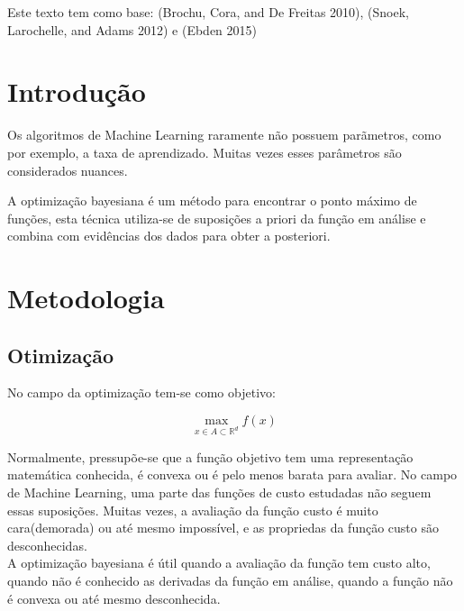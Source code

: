 \documentclass[
	12pt,				%
	openright,			%
	twoside,			%
	a4paper,			%
	english,			%
	french,				%
	spanish,			%
	brazil,				%
]{abntex2}
\begin{document}
\listoftables*
\cleardoublepage

\tableofcontents*
\cleardoublepage

\textual

Este texto tem como base: (Brochu, Cora, and De Freitas 2010), (Snoek,
Larochelle, and Adams 2012) e (Ebden 2015)

\hypertarget{introduuxe7uxe3o}{%
\chapter{Introdução}\label{introduuxe7uxe3o}}

Os algoritmos de Machine Learning raramente não possuem parãmetros, como
por exemplo, a taxa de aprendizado. Muitas vezes esses parâmetros são
considerados nuances.

A optimização bayesiana é um método para encontrar o ponto máximo de
funções, esta técnica utiliza-se de suposições a priori da função em
análise e combina com evidências dos dados para obter a posteriori. ~

\hypertarget{metodologia}{%
\chapter{Metodologia}\label{metodologia}}

\hypertarget{otimizauxe7uxe3o}{%
\section{Otimização}\label{otimizauxe7uxe3o}}

No campo da optimização tem-se como objetivo:

\[
\max\limits_{{x \in A \subset \mathbb{R}^d}} f(x)
\]

Normalmente, pressupõe-se que a função objetivo tem uma representação
matemática conhecida, é convexa ou é pelo menos barata para avaliar. No
campo de Machine Learning, uma parte das funções de custo estudadas não
seguem essas suposições. Muitas vezes, a avaliação da função custo é
muito cara(demorada) ou até mesmo impossível, e as propriedas da função
custo são desconhecidas.\\

A optimização bayesiana é útil quando a avaliação da função tem custo
alto, quando não é conhecido as derivadas da função em análise, quando a
função não é convexa ou até mesmo desconhecida.\\
\end{document}
